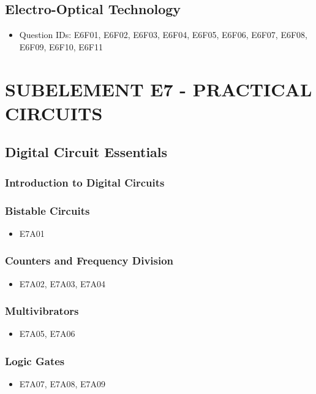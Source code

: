 \documentclass{book}
\begin{document}
\section{Electro-Optical Technology}
\begin{itemize}
    \item Question IDs: E6F01, E6F02, E6F03, E6F04, E6F05, E6F06, E6F07, E6F08, E6F09, E6F10, E6F11
\end{itemize}


\chapter{SUBELEMENT E7 - PRACTICAL CIRCUITS}

\section{Digital Circuit Essentials}
\subsection{Introduction to Digital Circuits}
\subsection{Bistable Circuits}
\begin{itemize}
    \item E7A01
\end{itemize}
\subsection{Counters and Frequency Division}
\begin{itemize}
    \item E7A02, E7A03, E7A04
\end{itemize}
\subsection{Multivibrators}
\begin{itemize}
    \item E7A05, E7A06
\end{itemize}
\subsection{Logic Gates}
\begin{itemize}
    \item E7A07, E7A08, E7A09
\end{itemize}
\end{document}
